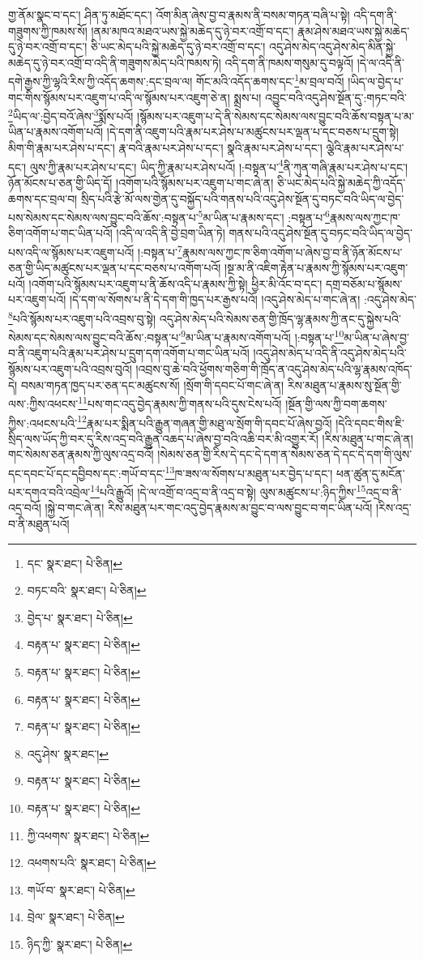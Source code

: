 གྱ་ནོམ་སྣང་བ་དང་། ཤིན་ཏུ་མཐོང་དང་། འོག་མིན་ཞེས་བྱ་བ་རྣམས་ནི་བསམ་གཏན་བཞི་པ་སྟེ། འདི་དག་ནི་གཟུགས་ཀྱི་ཁམས་སོ། །ནམ་མཁའ་མཐའ་ཡས་སྐྱེ་མཆེད་དུ་ཉེ་བར་འགྲོ་བ་དང་། རྣམ་ཤེས་མཐའ་ཡས་སྐྱེ་མཆེད་དུ་ཉེ་བར་འགྲོ་བ་དང་། ཅི་ཡང་མེད་པའི་སྐྱེ་མཆེད་དུ་ཉེ་བར་འགྲོ་བ་དང་། འདུ་ཤེས་མེད་འདུ་ཤེས་མེད་མིན་སྐྱེ་མཆེད་དུ་ཉེ་བར་འགྲོ་བ་འདི་ནི་གཟུགས་མེད་པའི་ཁམས་ཏེ། འདི་དག་ནི་ཁམས་གསུམ་དུ་བལྟའོ། །དེ་ལ་འདི་ནི་དགེ་རྒྱས་ཀྱི་ལྷའི་རིས་ཀྱི་འདོད་ཆགས་:དང་བྲལ་ལ། གོང་མའི་འདོད་ཆགས་དང་\footnote{དང་  སྣར་ཐང་།  པེ་ཅིན། }མ་བྲལ་བའོ། །ཡིད་ལ་བྱེད་པ་གང་གིས་སྙོམས་པར་འཇུག་པ་འདི་ལ་སྙོམས་པར་འཇུག་ཅེ་ན། སྨྲས་པ། འབྱུང་བའི་འདུ་ཤེས་སྔོན་དུ་:གཏང་བའི་\footnote{བཏང་བའི་  སྣར་ཐང་།  པེ་ཅིན། }ཡིད་ལ་:བྱེད་བའོ་ཞེས་\footnote{བྱེད་པ་  སྣར་ཐང་།  པེ་ཅིན། }སྨོས་པའོ། །སྙོམས་པར་འཇུག་པ་དེ་ནི་སེམས་དང་སེམས་ལས་བྱུང་བའི་ཆོས་བསྟན་པ་མ་ཡིན་པ་རྣམས་འགོག་པའོ། །དེ་དག་ནི་འཇུག་པའི་རྣམ་པར་ཤེས་པ་མཚུངས་པར་ལྡན་པ་དང་བཅས་པ་དྲུག་སྟེ། མིག་གི་རྣམ་པར་ཤེས་པ་དང་། རྣ་བའི་རྣམ་པར་ཤེས་པ་དང་། སྣའི་རྣམ་པར་ཤེས་པ་དང་། ལྕེའི་རྣམ་པར་ཤེས་པ་དང་། ལུས་ཀྱི་རྣམ་པར་ཤེས་པ་དང་། ཡིད་ཀྱི་རྣམ་པར་ཤེས་པའོ། །:བསྟན་པ་\footnote{བརྟན་པ་  སྣར་ཐང་།  པེ་ཅིན། }ནི་ཀུན་གཞི་རྣམ་པར་ཤེས་པ་དང་། ཉོན་མོངས་པ་ཅན་གྱི་ཡིད་དོ། །འགོག་པའི་སྙོམས་པར་འཇུག་པ་གང་ཞེ་ན། ཅི་ཡང་མེད་པའི་སྐྱེ་མཆེད་ཀྱི་འདོད་ཆགས་དང་བྲལ་བ། སྲིད་པའི་རྩེ་མོ་ལས་གྱེན་དུ་བསྐྱོད་པའི་གནས་པའི་འདུ་ཤེས་སྔོན་དུ་བཏང་བའི་ཡིད་ལ་བྱེད་པས་སེམས་དང་སེམས་ལས་བྱུང་བའི་ཆོས་:བསྟན་པ་\footnote{བརྟན་པ་  སྣར་ཐང་།  པེ་ཅིན། }མ་ཡིན་པ་རྣམས་དང་། :བསྟན་པ་\footnote{བརྟན་པ་  སྣར་ཐང་།  པེ་ཅིན། }རྣམས་ལས་ཀྱང་ཁ་ཅིག་འགོག་པ་གང་ཡིན་པའོ། །འདི་ལ་འདི་ནི་བྱེ་བྲག་ཡིན་ཏེ། གནས་པའི་འདུ་ཤེས་སྔོན་དུ་བཏང་བའི་ཡིད་ལ་བྱེད་པས་འདི་ལ་སྙོམས་པར་འཇུག་པའོ། །:བསྟན་པ་\footnote{བརྟན་པ་  སྣར་ཐང་།  པེ་ཅིན། }རྣམས་ལས་ཀྱང་ཁ་ཅིག་འགོག་པ་ཞེས་བྱ་བ་ནི་ཉོན་མོངས་པ་ཅན་གྱི་ཡིད་མཚུངས་པར་ལྡན་པ་དང་བཅས་པ་འགོག་པའོ། །སྔ་མ་ནི་འཇིག་རྟེན་པ་རྣམས་ཀྱི་སྙོམས་པར་འཇུག་པའོ། །འགོག་པའི་སྙོམས་པར་འཇུག་པ་ནི་ཆོས་འདི་པ་རྣམས་ཀྱི་སྟེ། ཕྱིར་མི་འོང་བ་དང་། དགྲ་བཅོམ་པ་སྙོམས་པར་འཇུག་པའོ། །དེ་དག་ལ་སོགས་པ་ནི་དེ་དག་གི་ཁྱད་པར་རྒྱས་པའོ། །འདུ་ཤེས་མེད་པ་གང་ཞེ་ན། :འདུ་ཤེས་མེད་\footnote{འདུ་ཤེས་  སྣར་ཐང་། }པའི་སྙོམས་པར་འཇུག་པའི་འབྲས་བུ་སྟེ། འདུ་ཤེས་མེད་པའི་སེམས་ཅན་གྱི་ཁྲོད་ལྷ་རྣམས་ཀྱི་ནང་དུ་སྐྱེས་པའི་སེམས་དང་སེམས་ལས་བྱུང་བའི་ཆོས་:བསྟན་པ་\footnote{བརྟན་པ་  སྣར་ཐང་།  པེ་ཅིན། }མ་ཡིན་པ་རྣམས་འགོག་པའོ། །:བསྟན་པ་\footnote{བརྟན་པ་  སྣར་ཐང་།  པེ་ཅིན། }མ་ཡིན་པ་ཞེས་བྱ་བ་ནི་འཇུག་པའི་རྣམ་པར་ཤེས་པ་དྲུག་དག་འགོག་པ་གང་ཡིན་པའོ། །འདུ་ཤེས་མེད་པ་འདི་ནི་འདུ་ཤེས་མེད་པའི་སྙོམས་པར་འཇུག་པའི་འབྲས་བུའོ། །འབྲས་བུ་ཆེ་བའི་ཕྱོགས་གཅིག་གི་ཁྲོད་ན་འདུ་ཤེས་མེད་པའི་ལྷ་རྣམས་འཁོད་དེ། བསམ་གཏན་ཁྱད་པར་ཅན་དང་མཚུངས་སོ། །སྲོག་གི་དབང་པོ་གང་ཞེ་ན། རིས་མཐུན་པ་རྣམས་སུ་སྔོན་གྱི་ལས་:ཀྱིས་འཕངས་\footnote{ཀྱི་འཕགས་  སྣར་ཐང་།  པེ་ཅིན། }པས་གང་འདུ་བྱེད་རྣམས་ཀྱི་གནས་པའི་དུས་ངེས་པའོ། །སྔོན་གྱི་ལས་ཀྱི་བག་ཆགས་ཀྱིས་:འཕངས་པའི་\footnote{འཕགས་པའི་  སྣར་ཐང་།  པེ་ཅིན། }རྣམ་པར་སྨིན་པའི་རྒྱུན་གཞན་གྱི་མཐུ་ལ་སྲོག་གི་དབང་པོ་ཞེས་བྱའོ། །དེའི་དབང་གིས་ཇི་སྲིད་ལས་ཡོད་ཀྱི་བར་དུ་རིས་འདྲ་བའི་རྒྱུན་འཆད་པ་ཞེས་བྱ་བའི་འཆི་བར་མི་འགྱུར་རོ། །རིས་མཐུན་པ་གང་ཞེ་ན། གང་སེམས་ཅན་རྣམས་ཀྱི་ལུས་འདྲ་བའོ། །སེམས་ཅན་གྱི་རིས་དེ་དང་དེ་དག་ན་སེམས་ཅན་དེ་དང་དེ་དག་གི་ལུས་དང་དབང་པོ་དང་དབྱིབས་དང་:གཡོ་བ་དང་\footnote{གཡོ་བ་  སྣར་ཐང་།  པེ་ཅིན། }ཁ་ཟས་ལ་སོགས་པ་མཐུན་པར་བྱེད་པ་དང་། ཕན་ཚུན་དུ་མངོན་པར་དགའ་བའི་འབྲེལ་\footnote{བྲེལ་  སྣར་ཐང་།  པེ་ཅིན། }པའི་རྒྱུའོ། །དེ་ལ་འགྲོ་བ་འདྲ་བ་ནི་འདྲ་བ་སྟེ། ལུས་མཚུངས་པ་:ཉིད་ཀྱིས་\footnote{ཉིད་ཀྱི་  སྣར་ཐང་།  པེ་ཅིན། }འདྲ་བ་ནི་འདྲ་བའོ། །སྐྱེ་བ་གང་ཞེ་ན། རིས་མཐུན་པར་གང་འདུ་བྱེད་རྣམས་མ་བྱུང་བ་ལས་བྱུང་བ་གང་ཡིན་པའོ། །རིས་འདྲ་བ་ནི་མཐུན་པའོ། 